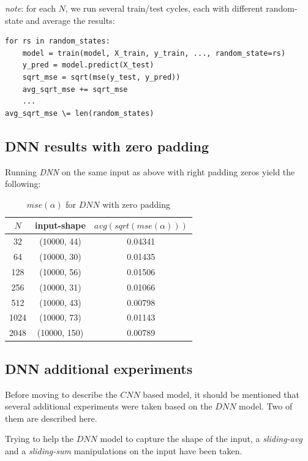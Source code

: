 \documentclass[a4paper, 12pt]{report}
\begin{document}
\textit{note}: for each $N$, we run several train/test cycles, each with different random-state and average the results:
\begin{verbatim}
for rs in random_states:
    model = train(model, X_train, y_train, ..., random_state=rs)
    y_pred = model.predict(X_test)
    sqrt_mse = sqrt(mse(y_test, y_pred))
    avg_sqrt_mse += sqrt_mse
    ...
avg_sqrt_mse \= len(random_states)
\end{verbatim}

\subsection{DNN results with zero padding}
\par Running \textit{DNN} on the same input as above with right padding zeros yield the following:
\begin{table}[h!]
    \centering
    \begin{tabular}{||c c c||} 
        \hline
        $N$ & input-shape & $avg(sqrt(mse(\alpha)))$ \\ [0.5ex] 
        \hline\hline
        32 & (10000, 44) & 0.04341 \\ 
        \hline
        64 & (10000, 30) & 0.01435 \\
        \hline
        128 & (10000, 56) & 0.01506 \\
        \hline
        256 & (10000, 31) & 0.01066 \\
        \hline
        512 & (10000, 43) & 0.00798 \\ 
        \hline
        1024 & (10000, 73) & 0.01143 \\ 
        \hline
        2048 & (10000, 150) & 0.00789 \\ 
        \hline
    \end{tabular}
    \caption{$mse(\alpha)$ for $DNN$ with zero padding}
    \label{table:2}
\end{table}

\pagebreak
\subsection{DNN additional experiments}
Before moving to describe the $CNN$ based model, it should be mentioned that several additional experiments were taken based on the $DNN$ model. Two of them are described here.

Trying to help the $DNN$ model to capture the shape of the input, a \textit{sliding-avg} and a \textit{sliding-sum} manipulations on the input have been taken.
\end{document}
